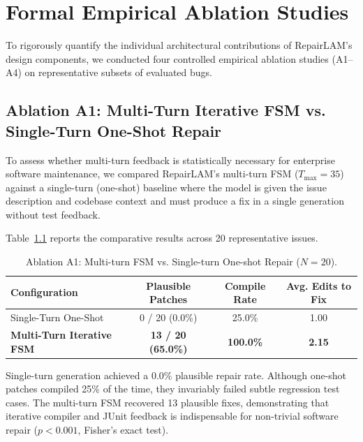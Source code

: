 \documentclass[12pt,a4paper]{report}
\begin{document}
\newpage
\chapter{Formal Empirical Ablation Studies}

To rigorously quantify the individual architectural contributions of RepairLAM's design components, we conducted four controlled empirical ablation studies (A1--A4) on representative subsets of evaluated bugs.

\section{Ablation A1: Multi-Turn Iterative FSM vs. Single-Turn One-Shot Repair}
To assess whether multi-turn feedback is statistically necessary for enterprise software maintenance, we compared RepairLAM's multi-turn FSM ($T_{\text{max}} = 35$) against a single-turn (one-shot) baseline where the model is given the issue description and codebase context and must produce a fix in a single generation without test feedback.

Table~\ref{tab:ablation_a1} reports the comparative results across 20 representative issues.

\begin{table}[htbp]
\centering
\caption{Ablation A1: Multi-turn FSM vs. Single-turn One-shot Repair ($N = 20$).}
\label{tab:ablation_a1}
\begin{tabular}{l c c c}
\toprule
\textbf{Configuration} & \textbf{Plausible Patches} & \textbf{Compile Rate} & \textbf{Avg. Edits to Fix} \\
\midrule
Single-Turn One-Shot & 0 / 20 (0.0\%) & 25.0\% & 1.00 \\
\textbf{Multi-Turn Iterative FSM} & \textbf{13 / 20 (65.0\%)} & \textbf{100.0\%} & \textbf{2.15} \\
\bottomrule
\end{tabular}
\end{table}

Single-turn generation achieved a 0.0\% plausible repair rate. Although one-shot patches compiled 25\% of the time, they invariably failed subtle regression test cases. The multi-turn FSM recovered 13 plausible fixes, demonstrating that iterative compiler and JUnit feedback is indispensable for non-trivial software repair ($p < 0.001$, Fisher's exact test).
\end{document}
